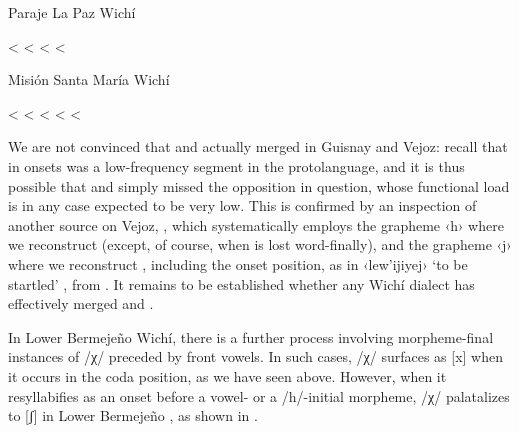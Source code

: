 \ea
Paraje La Paz Wichí \citep{AFG067}\\
    \begin{xlist}
        \ex {} <  \label{plp-hupel}
        \ex {} <  \label{plp-ahayuk}
        \ex {} \recind {} <  \label{plp-opajtit}
        \ex {} \recind {} <  \label{plp-asinaj}
    \end{xlist}
\z
\ea
Misión Santa María Wichí \citep{SS07}\\
    \begin{xlist}
        \ex {} \recind {} <  \label{msm-ochahuye}
        \ex {} \recind {} <  \label{msm-tsonhat}
        \ex {} \recind {} <  \label{msm-lakoj}
        \ex {} <  \label{msm-hosan}
        \ex {} <  \label{msm-hokinaj}
    \end{xlist}
\z
{}

We are not convinced that  and  actually merged in Guisnay and Vejoz: recall that  in onsets was a low-frequency segment in the protolanguage, and it is thus possible that \citet{VU74} and \citet{AFG067} simply missed the opposition in question, whose functional load is in any case expected to be very low. This is confirmed by an inspection of another source on Vejoz, \citet{MG-MELO15}, which systematically employs the grapheme ‹h› where we reconstruct  (except, of course, when  is lost word-finally), and the grapheme ‹j› where we reconstruct , including the onset position, as in ‹lew’ijiyej› `to be startled' \citep[37]{MG-MELO15}, from . It remains to be established whether any Wichí dialect has effectively merged  and .

In Lower Bermejeño Wichí, there is a further process involving morpheme-final instances of /χ/ preceded by front vowels. In such cases, /χ/ surfaces as [x] when it occurs in the coda position, as we have seen above. However, when it resyllabifies as an onset before a vowel\mbox{-} or a /h/-initial morpheme, /χ/ palatalizes to [ʃ] in Lower Bermejeño \citep[109--111]{VN14}, as shown in .

